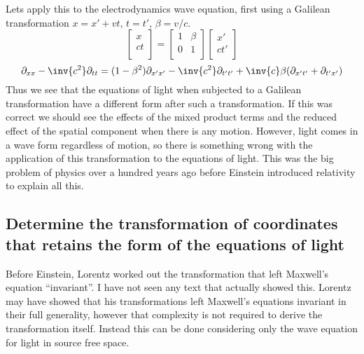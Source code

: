 Lets apply this to the electrodynamics wave equation, first using a Galilean transformation \(x = x' + v t\), \(t = t'\), \(\beta = v/c\).
%
\begin{equation}
\begin{bmatrix}
x \\
ct \\
\end{bmatrix}
=
\begin{bmatrix}
1 & \beta \\
0 & 1 \\
\end{bmatrix}
\begin{bmatrix}
x' \\
c t' \\
\end{bmatrix}
\end{equation}
%
\begin{equation}
\partial_{xx} -\inv{c^2}\partial_{tt} =
(1 - \beta^2)\partial_{x'x'}
-\inv{c^2}\partial_{t't'}
+\inv{c}\beta( \partial_{x't'} + \partial_{t'x'} )
\end{equation}
%
Thus we see that the equations of light when subjected to a Galilean transformation have a different form after such a
transformation.  If this was correct we should see the effects of the mixed product terms and the reduced effect of the
spatial component when there is any motion.  However, light comes in a wave form regardless of motion, so there
is something wrong with the application of this transformation to the equations of light.  This was the big problem of physics
over a hundred years ago before Einstein introduced relativity to explain all this.

\subsection{Determine the transformation of coordinates that retains the form of the equations of light}

Before Einstein, Lorentz worked out the transformation that left Maxwell's equation ``invariant''.  I have not seen
any text that actually showed this.  Lorentz may have showed that his transformations left Maxwell's equations
invariant in their full generality, however that complexity is not required to derive the transformation itself.  Instead
this can be done considering only the wave equation for light in source free space.


